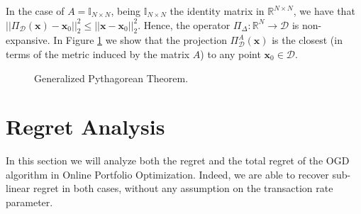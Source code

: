 In the case of $A=\mathbb I_{N\times N}$, being $\mathbb I_{N\times N}$ the identity matrix in $\mathbb R^{N\times N}$, we have that $||\Pi_\mathcal D(\mathbf x)-\mathbf x_0||_2^2\le||\mathbf x-\mathbf x_0||_2^2$. Hence, the operator $\Pi_\Delta:\mathbb R^N\to\mathcal D$ is non-expansive. In Figure \ref{fig:pitagora} we show that the projection $\Pi_\mathcal D^A(\mathbf x)$ is the closest (in terms of the metric induced by the matrix $A$) to any point $\mathbf x_0\in\mathcal D$.

\begin{figure}[ht!]
\centering

\caption{Generalized Pythagorean Theorem.}
\label{fig:pitagora}
\end{figure}

\section{Regret Analysis}

In this section we will analyze both the regret and the total regret of the OGD algorithm in Online Portfolio Optimization. Indeed, we are able to recover sub-linear regret in both cases, without any assumption on the transaction rate parameter.


